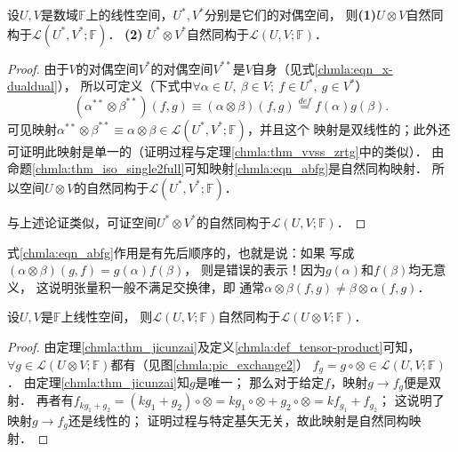 \begin{proposition}\label{chmla:thm_v-vstar}
    设$U,V$是数域$\mathbb{F}$上的线性空间，$U^*, V^*$分别是它们的对偶空间，
    则{\bfseries (1)}$U\otimes V$自然同构于$\mathscr{L}(U^*,V^*;\mathbb{F})$．
    {\bfseries (2)} $U^*\otimes V^*$自然同构于$\mathscr{L}(U,V;\mathbb{F})$．
\end{proposition}
\begin{proof}
    由于$V$的对偶空间$V^*$的对偶空间$V^{**}$是$V$自身（见式\eqref{chmla:eqn_x-dualdual}），
    所以可定义（下式中$\forall \alpha\in U,\  \beta \in V; \  f\in U^*,\  g\in V^* $）
\begin{equation}\label{chmla:eqn_abfg}
    (\alpha^{**} \otimes \beta^{**} )(f,g) \equiv
    (\alpha \otimes \beta )(f,g)
    \overset{def}{=} f(\alpha)g(\beta) .
\end{equation}  %
    可见映射$\alpha^{**} \otimes \beta^{**}\equiv \alpha \otimes \beta
    \in \mathscr{L}(U^*,V^*;\mathbb{F})$，并且这个
    映射是双线性的；此外还可证明此映射是单一的（证明过程与定理\ref{chmla:thm_vvss_zrtg}中的类似）．
    由命题\ref{chmla:thm_iso_single2full}可知映射\eqref{chmla:eqn_abfg}是自然同构映射．
    所以空间$U\otimes V$的自然同构于$\mathscr{L}(U^*,V^*;\mathbb{F})$．

    与上述论证类似，可证空间$U^*\otimes V^*$的自然同构于$\mathscr{L}(U,V;\mathbb{F})$．
\end{proof}

\begin{remark}\label{chmla:rmk_noncom}
式\eqref{chmla:eqn_abfg}作用是有先后顺序的，也就是说：如果
写成$(\alpha \otimes \beta )(g,f) = g(\alpha)f(\beta)$，
则是错误的表示！因为$g(\alpha)$和$f(\beta)$均无意义，
这说明张量积一般不满足交换律，即
通常$\alpha \otimes \beta(f,g) \neq \beta\otimes\alpha(f,g)$．
\end{remark}


\begin{proposition}\label{chmla:thm_uvequv}
    设$U,V$是$\mathbb{F}$上线性空间，
    则$\mathscr{L}(U,V;\mathbb{F})$自然同构于$\mathscr{L}(U\otimes V;\mathbb{F})$．
\end{proposition}
\begin{proof}
    由定理\ref{chmla:thm_jicunzai}及定义\ref{chmla:def_tensor-product}可知，
    $\forall g \in \mathscr{L}(U\otimes V;\mathbb{F})$都有（见图\ref{chmla:pic_exchange2}）
    $f_g = g \circ \otimes \in \mathscr{L}(U,V;\mathbb{F})$．
    由定理\ref{chmla:thm_jicunzai}知$g$是唯一；
    那么对于给定$f$，映射$g\to f_g$便是双射．
    再者有$f_{k g_1+ g_2} = (k g_1+  g_2)\circ \otimes
     = k g_1\circ \otimes+  g_2\circ \otimes = k f_{g_1}+ f_{g_2}$；
    这说明了映射$g\to f_g$还是线性的；
    证明过程与特定基矢无关，故此映射是自然同构映射．
\end{proof}


